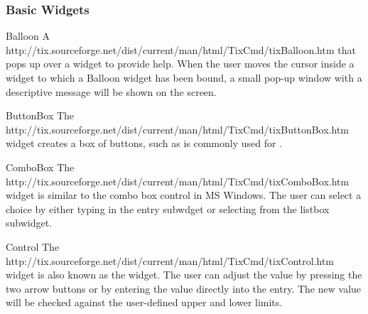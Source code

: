 

\subsubsection{Basic Widgets}

\begin{classdesc}{Balloon}{}
A 
{http://tix.sourceforge.net/dist/current/man/html/TixCmd/tixBalloon.htm}
that pops up over a widget to provide help.  When the user moves the
cursor inside a widget to which a Balloon widget has been bound, a
small pop-up window with a descriptive message will be shown on the
screen.
\end{classdesc}


\begin{classdesc}{ButtonBox}{}
The 
{http://tix.sourceforge.net/dist/current/man/html/TixCmd/tixButtonBox.htm}
widget creates a box of buttons, such as is commonly used for .
\end{classdesc}


\begin{classdesc}{ComboBox}{}
The 
{http://tix.sourceforge.net/dist/current/man/html/TixCmd/tixComboBox.htm}
widget is similar to the combo box control in MS Windows. The user can
select a choice by either typing in the entry subwdget or selecting
from the listbox subwidget.
\end{classdesc}


\begin{classdesc}{Control}{}
The 
{http://tix.sourceforge.net/dist/current/man/html/TixCmd/tixControl.htm}
widget is also known as the  widget. The user can
adjust the value by pressing the two arrow buttons or by entering the
value directly into the entry. The new value will be checked against
the user-defined upper and lower limits.
\end{classdesc}


